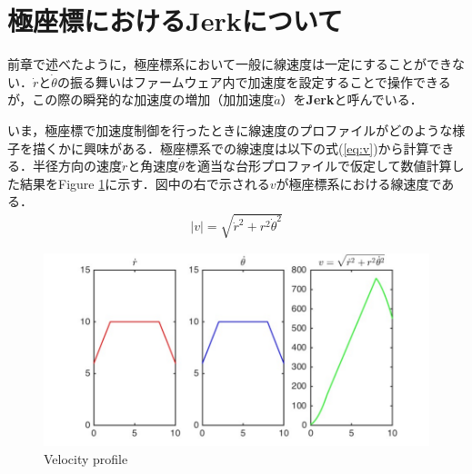 \documentclass[twocolumn,oneside,a4paper]{article}
\begin{document}

\appendix
\section{極座標におけるJerkについて}
前章で述べたように，極座標系において一般に線速度は一定にすることができない．$\dot{r}$と$\dot{\theta}$の振る舞いはファームウェア内で加速度を設定することで操作できるが，この際の瞬発的な加速度の増加（加加速度$\dot{a}$）を{\bf Jerk}と呼んでいる．

いま，極座標で加速度制御を行ったときに線速度のプロファイルがどのような様子を描くかに興味がある．極座標系での線速度は以下の式(\ref{eq:v})から計算できる．半径方向の速度$\dot{r}$と角速度$\dot{\theta}$を適当な台形プロファイルで仮定して数値計算した結果をFigure \ref{fig:jerk}に示す．図中の右で示される$v$が極座標系における線速度である．
\begin{eqnarray}\label{eq:v}
	|v| = \sqrt{ \dot{r}^2+ r^2 \dot{\theta}^2 } 
\end{eqnarray}

\begin{figure}[htbp]
    \includegraphics[bb=0 0 432 216,width=1\columnwidth]{accel2.pdf}
    \caption{Velocity profile}
    \label{fig:jerk}
\end{figure}
\end{document}
